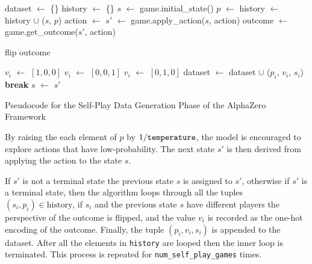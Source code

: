 \begin{algorithm}[H]
    \begin{algorithmic}[1]
            \State dataset $\gets$ \{\}
            \Repeat
            \State history $\gets$ \{\}
            \State $s$ $\gets$ game.initial\_state()
            \Loop
                \State $p$ $\gets$ 
                \State history $\gets$ history $\cup$ ($s$, $p$)
                \State action $\gets$ 
                \State $s'$ $\gets$ game.apply\_action($s$, action)
                        \State outcome $\gets$ game.get\_outcome($s'$, action)

                          \State flip outcome
                        \EndIf

                          \State $v_i$ $\gets$ $[1, 0, 0]$
                          \State $v_i$ $\gets$ $[0, 0, 1]$
                          \State $v_i$ $\gets$ $[0, 1, 0]$
                        \EndIf
                        \State dataset $\gets$ dataset $\cup$ ($p_i$, $v_i$, $s_i$)
                    \EndFor
                    \State \textbf{break}
                \EndIf
                \State $s$ $\gets$ $s'$
            \EndLoop
        \State {}
        \EndFunction
    \end{algorithmic}
    \caption{Pseudocode for the Self-Play Data Generation Phase of the AlphaZero Framework}
    \label{alg:data-generation}
\end{algorithm}

By raising the each element of $p$ by $1/\verb|temperature|$, the model is encouraged to explore actions that have low-probability. The next state $s'$ is then derived from applying the action to the state $s$. 

If $s'$ is not a terminal state the previous state $s$ is assigned to $s'$, otherwise if $s'$ is a terminal state, then the algorithm loops through all the tuples $(s_i, p_i) \in \text{history}$, if $s_i$ and the previous state $s$ have different players the perspective of the outcome is flipped, and the value $v_i$ is recorded as the one-hot encoding of the outcome. Finally, the tuple $(p_i, v_i, s_i)$ is appended to the dataset. After all the elements in \verb|history| are looped then the inner loop is terminated. This process is repeated for \verb|num_self_play_games| times.

